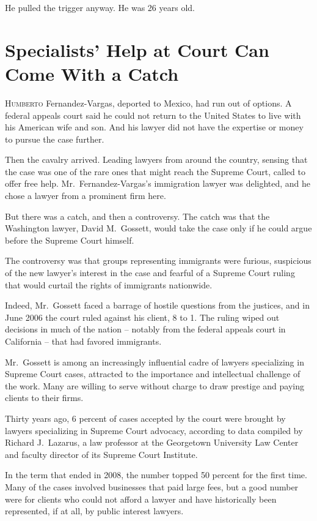 ﻿\documentclass[12pt]{article}
\begin{document}
He pulled the trigger anyway. He was 26 years old.

\section{Specialists' Help at Court Can Come With a Catch}

\lettrine{H}{umberto} Fernandez-Vargas, deported to Mexico, had run out of
options. A federal appeals court said he could not return to the United States to live with his
American wife and son. And his lawyer did not have the expertise or money to pursue the case
further.

Then the cavalry arrived. Leading lawyers from around the country, sensing that the case was one of
the rare ones that might reach the Supreme Court, called to offer free help. Mr.~Fernandez-Vargas's
immigration lawyer was delighted, and he chose a lawyer from a prominent firm here.

But there was a catch, and then a controversy. The catch was that the Washington lawyer, David
M.~Gossett, would take the case only if he could argue before the Supreme Court himself.

The controversy was that groups representing immigrants were furious, suspicious of the new lawyer's
interest in the case and fearful of a Supreme Court ruling that would curtail the rights of
immigrants nationwide.

Indeed, Mr.~Gossett faced a barrage of hostile questions from the justices, and in June 2006 the
court ruled against his client, 8 to 1. The ruling wiped out decisions in much of the nation --
notably from the federal appeals court in California -- that had favored immigrants.

Mr.~Gossett is among an increasingly influential cadre of lawyers specializing in Supreme Court
cases, attracted to the importance and intellectual challenge of the work. Many are willing to serve
without charge to draw prestige and paying clients to their firms.

Thirty years ago, 6 percent of cases accepted by the court were brought by lawyers specializing in
Supreme Court advocacy, according to data compiled by Richard J.~Lazarus, a law professor at the
Georgetown University Law Center and faculty director of its Supreme Court Institute.

In the term that ended in 2008, the number topped 50 percent for the first time. Many of the cases
involved businesses that paid large fees, but a good number were for clients who could not afford a
lawyer and have historically been represented, if at all, by public interest lawyers.
\end{document}
